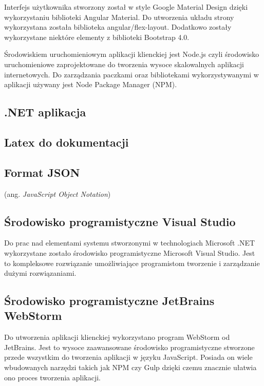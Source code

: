 Interfejs użytkownika stworzony został w style Google Material Design dzięki wykorzystaniu biblioteki Angular Material. Do utworzenia układu strony wykorzystana została biblioteka angular/flex-layout. Dodatkowo zostały wykorzystane niektóre elementy z biblioteki Bootstrap 4.0.

Środowiskiem uruchomieniowym aplikacji klienckiej jest Node.js czyli środowisko uruchomieniowe zaprojektowane do tworzenia wysoce skalowalnych aplikacji internetowych. Do zarządzania paczkami oraz bibliotekami wykorzystywanymi w aplikacji używany jest Node Package Manager (NPM).
\subsection{.NET aplikacja}
\subsection{Latex do dokumentacji}
\subsection{Format JSON}
(ang. \textit{JavaScript Object Notation}) \cite{json2017}
\subsection{Środowisko programistyczne Visual Studio}
Do prac nad elementami systemu stworzonymi w technologiach Microsoft .NET wykorzystane zostało środowisko programistyczne Microsoft Visual Studio. Jest to kompleksowe rozwiązanie umożliwiające programistom tworzenie i zarządzanie dużymi rozwiązaniami.
\subsection{Środowisko programistyczne JetBrains WebStorm}
Do utworzenia aplikacji klienckiej wykorzystano program WebStorm od JetBrains. Jest to wysoce zaawansowane środowisko programistyczne stworzone przede wszystkim do tworzenia aplikacji w języku JavaScript. Posiada on wiele wbudowanych narzędzi takich jak NPM czy Gulp dzięki czemu znacznie ułatwia ono proces tworzenia aplikacji.